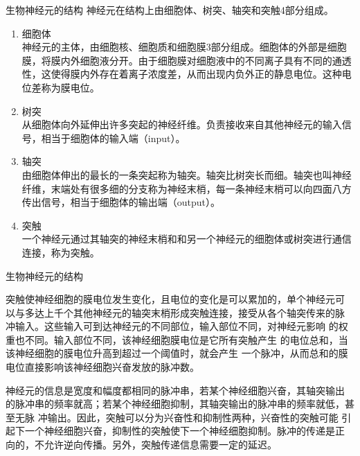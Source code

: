 \documentclass[xcolor=svgnames]{beamer}
\begin{document}
\begin{frame}{生物神经元的结构}
  \small
  神经元在结构上由\alert{细胞体}、\alert{树突}、\alert{轴突}和\alert{突触}4部分组成。
  \begin{enumerate}
  \item 细胞体\\
    神经元的主体，由\alert{细胞核}、\alert{细胞质}和\alert{细胞膜}3部分组成。细胞体的外部是细胞膜，将膜内外细胞液分开。由于细胞膜对细胞液中的不同离子具有不同的通透性，这使得膜内外存在着离子浓度差，从而出现内负外正的静息电位。这种电位差称为\alert{膜电位}。
  \item 树突\\
    从细胞体向外延伸出许多突起的神经纤维。负责接收来自其他神经元的输入信号，相当于细胞体的\alert{输入端（input）}。
  \item 轴突\\
    由细胞体伸出的最长的一条突起称为轴突。轴突比树突长而细。轴突也叫神经纤维，末端处有很多细的分支称为神经末梢，每一条神经末梢可以向四面八方传出信号，相当于细胞体的\alert{输出端（output）}。
  \item 突触\\
    一个神经元通过其轴突的神经末梢和和另一个神经元的细胞体或树突进行\alert{通信连接}，称为突触。
  \end{enumerate}
\end{frame}


\begin{frame}{生物神经元的结构}
  \setlength\parindent{2em}
  
  突触使神经细胞的膜电位发生变化，且电位的变化是可以\alert{累加}的，单个神经元可
  以与多达上千个其他神经元的轴突末梢形成突触连接，接受从各个轴突传来的\alert{脉
    冲}输入。这些输入可到达神经元的不同部位，输入部位不同，对神经元影响
  的\alert{权重}也不同。输入部位不同，该神经细胞\alert{膜电位}是它所有突触产生
  的\alert{电位总和}，当该神经细胞的膜电位升高到超过一个\alert{阈值}时，就会产生
  一个\alert{脉冲}，从而总和的膜电位直接影响该神经细胞兴奋发放的脉冲数。

  神经元的信息是宽度和幅度都相同的\alert{脉冲串}，若某个神经细胞兴奋，其轴突输出
  的脉冲串的频率就高；若某个神经细胞抑制，其轴突输出的脉冲串的频率就低，甚至无脉
  冲输出。因此，突触可以分为\alert{兴奋性}和\alert{抑制性}两种，兴奋性的突触可能
  引起下一个神经细胞兴奋，抑制性的突触使下一个神经细胞抑制。脉冲的传递是\alert{正
    向}的，不允许逆向传播。另外，突触传递信息需要一定的\alert{延迟}。
\end{frame}
\end{document}
